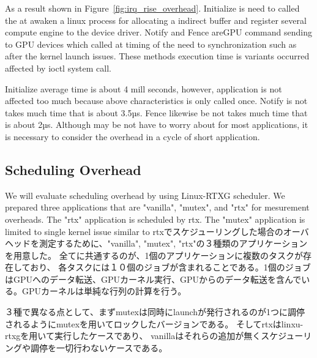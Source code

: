 As a result shown in Figure~\ref{fig:irq_rise_overhead}.
Initialize is need to called the at awaken a linux process for allocating a indirect buffer and register several compute engine to the device driver.
Notify and Fence areGPU command sending to GPU devices which called at timing of the need to synchronization such as after the kernel launch issues.
These methods execution time is variants occurred affected by ioctl system call.

Initialize average time is about 4 mill seconds, however, application is not affected too much because above characteristics is only called once.
Notify is not takes much time that is about 3.5µs.
Fence likewise be not takes much time that is about 2µs.
Although may be not have to worry about for most applications,
it is necessary to consider the overhead in a cycle of short application.

\subsection{Scheduling Overhead}\label{sec:eval:sched_overhead}
We will evaluate scheduling overhead by using Linux-RTXG scheduler.
We prepared three applications that are "vanilla", "mutex", and "rtx" for mesurement overheads.
The "rtx" application is scheduled by rtx.
The "mutex" application  is limited to single kernel issue similar to 
rtxでスケジューリングした場合のオーバヘッドを測定するために、"vanilla", "mutex", "rtx"の３種類のアプリケーションを用意した。
全てに共通するのが、1個のアプリケーションに複数のタスクが存在しており、
各タスクには１０個のジョブが含まれることである。1個のジョブはGPUへのデータ転送、GPUカーネル実行、GPUからのデータ転送を含んでいる。GPUカーネルは単純な行列の計算を行う。

３種で異なる点として、まずmutexは同時にlaunchが発行されるのが1つに調停されるようにmutexを用いてロックしたバージョンである。
そしてrtxはlinxu-rtxgを用いて実行したケースであり、
vanillaはそれらの追加が無くスケジューリングや調停を一切行わないケースである。


